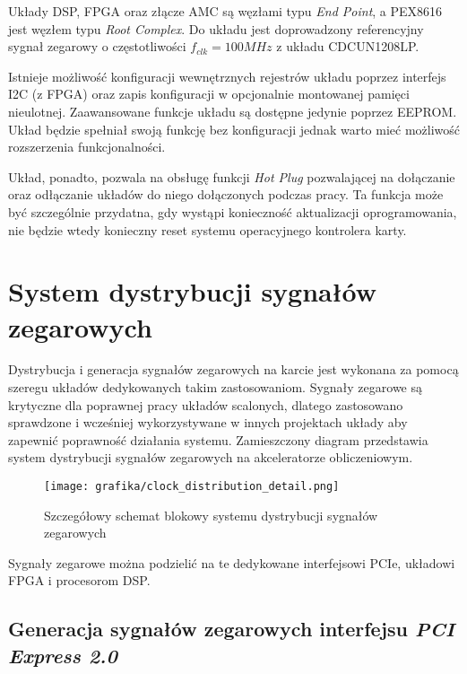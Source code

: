Układy DSP, FPGA oraz złącze AMC są węzłami typu \textit{End Point}, a PEX8616 jest węzłem typu \textit{Root Complex}. Do układu jest doprowadzony referencyjny sygnał zegarowy o częstotliwości $f_{clk}=100MHz$ z układu CDCUN1208LP. 

Istnieje możliwość konfiguracji wewnętrznych rejestrów układu poprzez interfejs I2C (z FPGA) oraz zapis konfiguracji w opcjonalnie montowanej pamięci nieulotnej. Zaawansowane funkcje układu są dostępne jedynie poprzez EEPROM. Układ będzie spełniał swoją funkcję bez konfiguracji jednak warto mieć możliwość rozszerzenia funkcjonalności.

Układ, ponadto, pozwala na obsługę funkcji \textit{Hot Plug} pozwalającej na dołączanie oraz odłączanie układów do niego dołączonych podczas pracy. Ta funkcja może być szczególnie przydatna, gdy wystąpi konieczność aktualizacji oprogramowania, nie będzie wtedy konieczny reset systemu operacyjnego kontrolera karty.


\section{System dystrybucji sygnałów zegarowych}
% 
Dystrybucja i generacja sygnałów zegarowych na karcie jest wykonana za pomocą szeregu układów dedykowanych takim zastosowaniom. Sygnały zegarowe są krytyczne dla poprawnej pracy układów scalonych, dlatego zastosowano sprawdzone i wcześniej wykorzystywane w innych projektach układy aby zapewnić poprawność działania systemu. Zamieszczony diagram przedstawia system dystrybucji sygnałów zegarowych na akceleratorze obliczeniowym. 
 \begin{figure}[here]
\begin{center}
\texttt{[image: grafika/clock\_distribution\_detail.png]}
\caption{Szczegółowy schemat blokowy systemu dystrybucji sygnałów zegarowych}
\end{center}
\end{figure}

Sygnały zegarowe można podzielić na te dedykowane interfejsowi PCIe, układowi FPGA i procesorom DSP.  

\subsection{Generacja sygnałów zegarowych interfejsu \textit{PCI Express 2.0}} 

